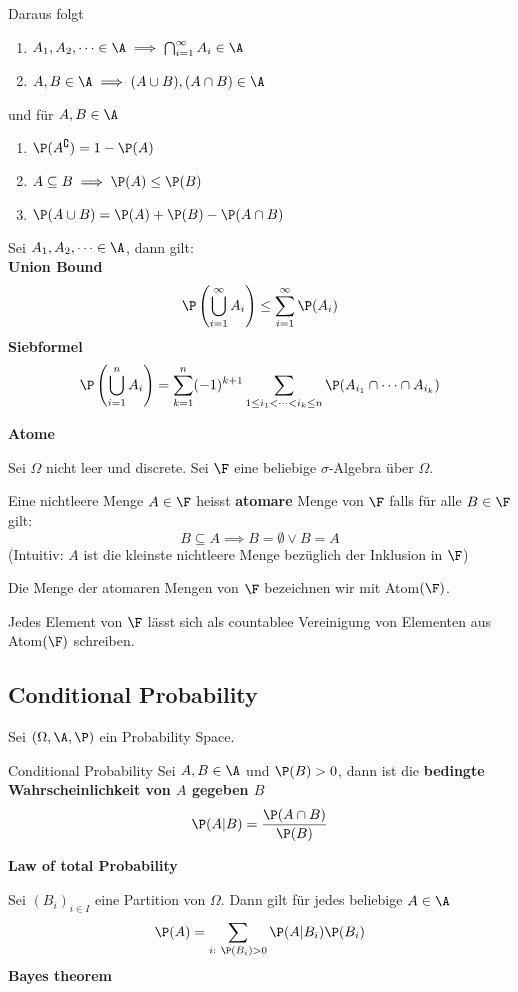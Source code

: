 Daraus folgt
\begin{enumerate}[label=\arabic*.]
    \item $A_1,A_2, \dots \in \A \implies \bigcap_{i=1}^{\infty}A_i \in \A$
    \item $A,B \in \A \implies (A \cup B), (A \cap B) \in \A$
\end{enumerate}
und für $A, B \in \A$
\begin{enumerate}[label=\arabic*.]
    \item $\P(A^\complement) = 1 - \P(A)$
    \item $A \subseteq B \implies \P(A) \leq \P(B)$
    \item $\P(A \cup B) = \P(A)+\P(B)-\P(A \cap B)$
\end{enumerate}
Sei $A_1,A_2, \dots \in \A$, dann gilt:\\
\textbf{Union Bound}
    $$\P\left(\bigcup_{i=1}^{\infty} A_i \right) \leq \sum_{i=1}^{\infty}\P(A_i)$$
\textbf{Siebformel}
    $$\P\left(\bigcup_{i=1}^{n}A_i\right) = \sum_{k = 1}^{n}(-1)^{k+1}\sum_{1\leq i_1 < \dots < i_k \leq n} \P(A_{i_1} \cap \dots \cap A_{i_k})$$

    \textbf{Atome}

        Sei $\Omega$ nicht leer und discrete. Sei $\F$ eine beliebige $\sigma$-Algebra über $\Omega$. 
    
        Eine nichtleere Menge $A \in \F$ heisst \textbf{atomare} Menge von $\F$ falls für alle $B \in \F$ gilt:
        $$B \subseteq A \implies B = \emptyset \lor B = A$$
        (Intuitiv: $A$ ist die kleinste nichtleere Menge bezüglich der Inklusion in $\F$)
    
        Die Menge der atomaren Mengen von $\F$ bezeichnen wir mit Atom$(\F)$.
    
        Jedes Element von $\F$ lässt sich als countablee Vereinigung von Elementen aus Atom$(\F)$ schreiben.
    
\subsection{Conditional Probability}
 Sei $(\Omega, \A, \P)$ ein Probability Space.
 \begin{mainbox}{Conditional Probability}
    Sei $A, B \in \A$ und $\P(B) > 0$, dann ist die \textbf{bedingte Wahrscheinlichkeit von $A$ gegeben $B$}
    $$\P(A|B) = \frac{\P(A \cap B)}{\P(B)}$$
 \end{mainbox}
\textbf{Law of total Probability}

Sei $(B_i)_{i\in I}$ eine Partition von $\Omega$. Dann gilt für jedes beliebige $A \in \A$
$$\P(A) = \sum_{i:\ \P(B_i)>0} \P(A|B_i)\P(B_i)$$
\textbf{Bayes theorem}

